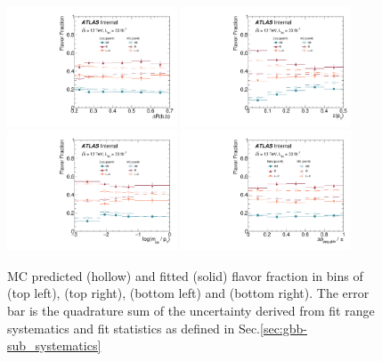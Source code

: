 \begin{figure}[htbp]
  \centering
  \includegraphics[width=0.45\textwidth]{figures/gbb/paperplots/Canv_dR_FracDataMC}
  \includegraphics[width=0.45\textwidth]{figures/gbb/paperplots/Canv_ZpT_FracDataMC}
  \includegraphics[width=0.45\textwidth]{figures/gbb/paperplots/Canv_fracmasspt_FracDataMC}       
  \includegraphics[width=0.45\textwidth]{figures/gbb/paperplots/Canv_dphi_FracDataMC}       
\caption{MC predicted (hollow) and fitted (solid) flavor fraction in bins of \drbb (top left), \zpt (top right), \mpt (bottom left) and \dphi (bottom right). The error bar is the quadrature sum of the uncertainty derived from fit range systematics and fit statistics as defined in Sec.\ref{sec:gbb-sub_systematics} }
  \label{fig:gbb-fitfrac}
\end{figure}


